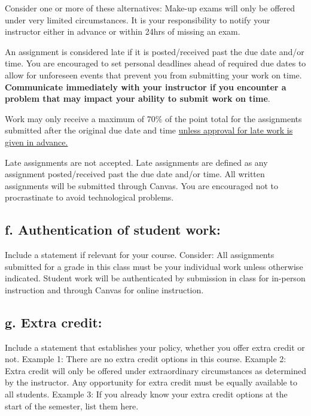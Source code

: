 \documentclass[12pt]{article}
\begin{document}
{\color{suggestionred}Consider one or more of these alternatives: Make-up exams will only be offered under very limited circumstances. It is your responsibility to notify your instructor either in advance or within 24hrs of missing an exam.}

{\color{suggestionred}An assignment is considered late if it is posted/received past the due date and/or time. You are encouraged to set personal deadlines ahead of required due dates to allow for unforeseen events that prevent you from submitting your work on time. \textbf{Communicate immediately with your instructor if you encounter a problem that may impact your ability to submit work on time}.}

{\color{suggestionred}Work may only receive a maximum of 70\% of the point total for the assignments submitted after the original due date and time \uline{unless approval for late work is given in advance.}}

{\color{suggestionred}Late assignments are not accepted. Late assignments are defined as any assignment posted/received past the due date and/or time. All written assignments will be submitted through Canvas. You are encouraged not to procrastinate to avoid technological problems.}

\subsection*{f. Authentication of student work:}
{\color{annotationblue}Include a statement if relevant for your course.} {\color{suggestionred}Consider: All assignments submitted for a grade in this class must be your individual work unless otherwise indicated. Student work will be authenticated by submission in class for in-person instruction and through Canvas for online instruction.}

\subsection*{g. Extra credit:}
{\color{annotationblue}Include a statement that establishes your policy, whether you offer extra credit or not.} {\color{suggestionred}Example 1: There are no extra credit options in this course. Example 2: Extra credit will only be offered under extraordinary circumstances as determined by the instructor. Any opportunity for extra credit must be equally available to all students. Example 3: If you already know your extra credit options at the start of the semester, list them here.}
\end{document}
